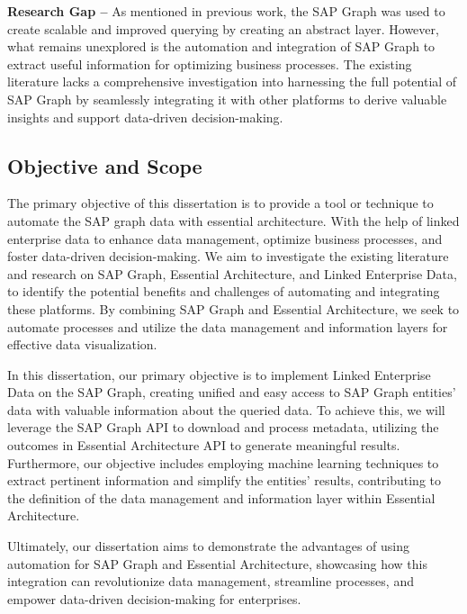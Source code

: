 \documentclass{article}
\begin{document}
\textbf{Research Gap –} As mentioned in previous work, the SAP Graph was used to create scalable and improved querying by creating an abstract layer. However, what remains unexplored is the automation and integration of SAP Graph to extract useful information for optimizing business processes. The existing literature lacks a comprehensive investigation into harnessing the full potential of SAP Graph by seamlessly integrating it with other platforms to derive valuable insights and support data-driven decision-making.

\maketitle
\subsection{Objective and Scope}
The primary objective of this dissertation is to provide a tool or technique to automate the SAP graph data with essential architecture. With the help of linked enterprise data to enhance data management, optimize business processes, and foster data-driven decision-making. We aim to investigate the existing literature and research on SAP Graph, Essential Architecture, and Linked Enterprise Data, to identify the potential benefits and challenges of automating and integrating these platforms. By combining SAP Graph and Essential Architecture, we seek to automate processes and utilize the data management and information layers for effective data visualization. 

In this dissertation, our primary objective is to implement Linked Enterprise Data on the SAP Graph, creating unified and easy access to SAP Graph entities' data with valuable information about the queried data. To achieve this, we will leverage the SAP Graph API to download and process metadata, utilizing the outcomes in Essential Architecture API to generate meaningful results. Furthermore, our objective includes employing machine learning techniques to extract pertinent information and simplify the entities' results, contributing to the definition of the data management and information layer within Essential Architecture.

Ultimately, our dissertation aims to demonstrate the advantages of using automation for SAP Graph and Essential Architecture, showcasing how this integration can revolutionize data management, streamline processes, and empower data-driven decision-making for enterprises.
\end{document}
